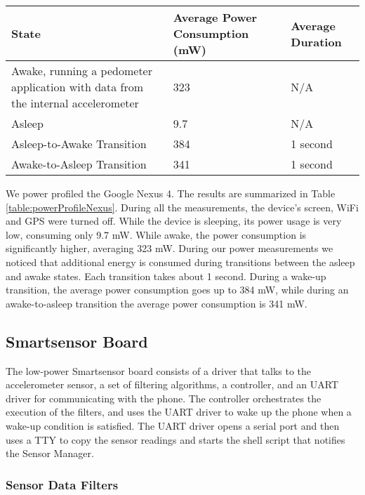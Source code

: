 \begin{table*}[t]
{\small
	\begin{tabular}{| p{7cm} | l | l |}
		\hline
		State & Average Power Consumption (mW) & Average Duration \\ \hline
		Awake, running a pedometer application with data from the internal accelerometer & 323 & N/A \\ \hline
		Asleep & 9.7 & N/A \\ \hline
		Asleep-to-Awake Transition & 384 & 1 second \\ \hline
		Awake-to-Asleep Transition & 341 & 1 second \\ \hline
	\end{tabular}
}
	\caption{Google Nexus 4 power profile.}
	\label{table:powerProfileNexus}
\end{table*}

We power profiled the Google Nexus 4. The results are summarized in
Table \ref{table:powerProfileNexus}. During all the measurements, the
device's screen, WiFi and GPS were turned off.  While the device is
sleeping, its power usage is very low, consuming only 9.7 mW. While
awake, the power consumption is significantly higher, averaging 323
mW. During our power measurements we noticed that additional energy is
consumed during transitions between the asleep and awake states. Each
transition takes about 1 second. During a wake-up transition, the
average power consumption goes up to 384 mW, while during an
awake-to-asleep transition the average power consumption is 341 mW.


\subsection{Smartsensor Board}
\label{subsec:sensorBoard}

The low-power Smartsensor board consists of a driver that talks to
the accelerometer sensor, a set of filtering algorithms, a controller,
and an UART driver for communicating with the phone. The controller
orchestrates the execution of the filters, and uses the UART driver to
wake up the phone when a wake-up condition is satisfied.  The UART driver
opens a serial port and then uses a TTY to copy the sensor readings
and starts the shell script that notifies the Sensor Manager.


\subsubsection{Sensor Data Filters}
\label{sec:sensorDataFilters}

